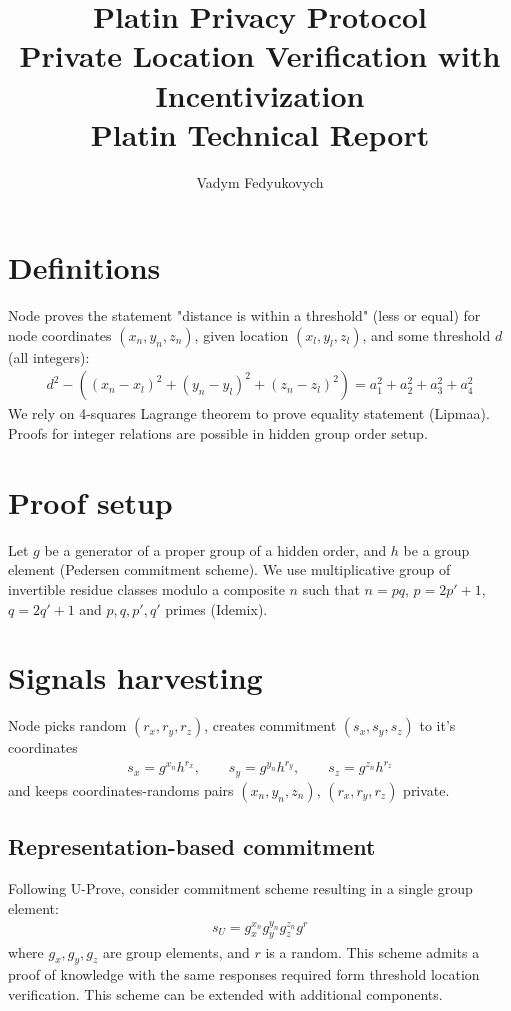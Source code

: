 \documentclass[a4paper,12pt]{article}
\author{
  \small{
  Vadym Fedyukovych
  }
}
\title{Platin Privacy Protocol \\
\small{
  Private Location Verification with Incentivization
} \\
\large{
  Platin Technical Report
}
}
\begin{document}
\maketitle
{}

\section{Definitions}
\label{sect-definitions}
Node proves the statement "distance is within a threshold" (less or equal)
for node coordinates $(x_n, y_n, z_n)$,
given location $(x_l, y_l, z_l)$,
and some threshold $d$ (all integers):
\begin{gather}
\label{eq-distn}
  d^2 - ((x_n - x_l)^2 + (y_n - y_l)^2 + (z_n - z_l)^2) = a_1^2 + a_2^2 + a_3^2 + a_4^2
\end{gather}
We rely on 4-squares Lagrange theorem to prove equality statement (Lipmaa).
Proofs for integer relations are possible in hidden group order setup.

\section{Proof setup}

Let $g$ be a generator of a proper group of a hidden order,
and $h$ be a group element (Pedersen commitment scheme).
We use multiplicative group of invertible residue classes modulo a composite $n$ such that
$n=pq$, $p=2p'+1$, $q=2q'+1$ and $p, q, p', q'$ primes (Idemix).

\section{Signals harvesting}
Node picks random $(r_x, r_y, r_z)$, creates commitment $(s_x, s_y, s_z)$ to it's coordinates
\begin{gather}
\label{cmt-pedr}
  s_x = g^{x_n} h^{r_x},   \qquad
  s_y = g^{y_n} h^{r_y},   \qquad
  s_z = g^{z_n} h^{r_z}
\end{gather}
and keeps coordinates-randoms pairs
$(x_n, y_n, z_n)$, $(r_x, r_y, r_z)$
private.

\subsection{Representation-based commitment}
Following U-Prove, consider commitment scheme resulting in a single group element:
\begin{gather}
\label{cmt-up}
  s_U = g_x^{x_n} g_y^{y_n} g_z^{z_n} g^{r}
\end{gather}
where $g_x, g_y, g_z$ are group elements, and $r$ is a random.
This scheme admits a proof of knowledge with the same responses required form threshold location verification.
This scheme can be extended with additional components. %
\end{document}
